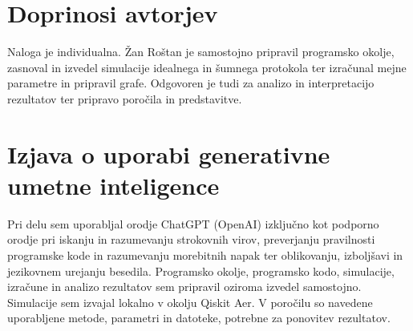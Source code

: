 \section*{Doprinosi avtorjev}
Naloga je individualna. Žan Roštan je samostojno pripravil programsko okolje, zasnoval in izvedel simulacije idealnega in šumnega protokola ter izračunal mejne parametre in pripravil grafe. Odgovoren je tudi za analizo in interpretacijo rezultatov ter pripravo poročila in predstavitve.

\section*{Izjava o uporabi generativne umetne inteligence}
Pri delu sem uporabljal orodje ChatGPT (OpenAI) izključno kot podporno orodje pri iskanju in razumevanju strokovnih virov, preverjanju pravilnosti programske kode in razumevanju morebitnih napak ter oblikovanju, izboljšavi in jezikovnem urejanju besedila. Programsko okolje, programsko kodo, simulacije, izračune in analizo rezultatov sem pripravil oziroma izvedel samostojno. Simulacije sem izvajal lokalno v okolju Qiskit Aer. V poročilu so navedene uporabljene metode, parametri in datoteke, potrebne za ponovitev rezultatov.